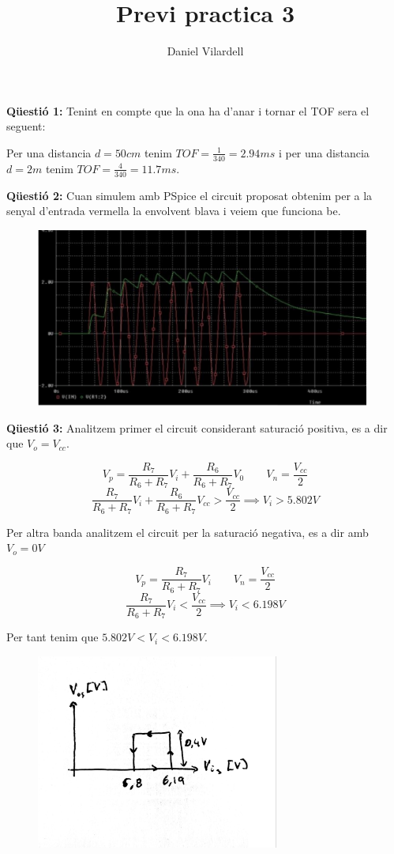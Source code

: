 \documentclass[12pt, a4papre]{article}
\author{Daniel Vilardell}
\title{Previ practica 3}
\date{}
\begin{document}
	\maketitle
	
	\textbf{Qüestió 1:} Tenint en compte que la ona ha d'anar i tornar el TOF sera el seguent:
	
	Per una distancia $d = 50cm$ tenim $TOF = \frac{1}{340} = 2.94ms$ i per una distancia $d = 2m$ tenim $TOF = \frac{4}{340} = 11.7ms$.
	
	\textbf{Qüestió 2:} Cuan simulem amb PSpice el circuit proposat obtenim per a la senyal d'entrada vermella la envolvent blava i veiem que funciona be.
	
	\begin{figure}[H]
		\begin{center}
		\includegraphics[width=110mm]{previ_4_1.png}
		\end{center}
	\end{figure}
	
	\textbf{Qüestió 3:} Analitzem primer el circuit considerant saturació positiva, es a dir que $V_o = V_{cc}$.
	
	\[
		V_p = \frac{R_7}{R_6 + R_7}V_i+\frac{R_6}{R_6 + R_7}V_0 \qquad V_n = \frac{V_{cc}}{2}
	\]
	\[
		\frac{R_7}{R_6 + R_7}V_i+\frac{R_6}{R_6 + R_7}V_{cc} >  \frac{V_{cc}}{2} \implies V_i > 5.802V
	\]
	
	Per altra banda analitzem el circuit per la saturació negativa, es a dir amb $V_o = 0V$
	
	\[
		V_p = \frac{R_7}{R_6 + R_7}V_i \qquad V_n = \frac{V_{cc}}{2}
	\]
	\[
		\frac{R_7}{R_6 + R_7}V_i < \frac{V_{cc}}{2} \implies V_i < 6.198V
	\]
	
	Per tant tenim que $5.802V < V_i < 6.198V$.
	
	\begin{figure}[H]
		\begin{center}
		\includegraphics[width=80mm]{previ_4_1_2.jpeg}
		\end{center}
	\end{figure}
	
	
\end{document}
